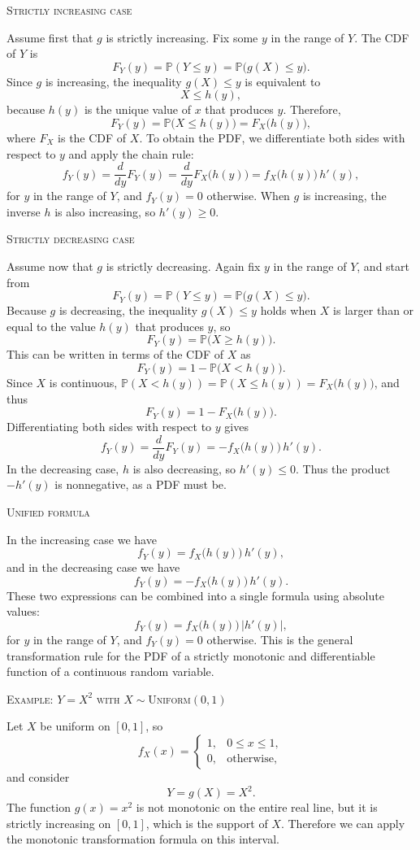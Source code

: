 \textsc{Strictly increasing case}

Assume first that \(g\) is strictly increasing.  
Fix some \(y\) in the range of \(Y\).  
The CDF of \(Y\) is
\[
F_Y(y)
=
\mathbb{P}(Y \le y)
=
\mathbb{P}\big(g(X) \le y\big).
\]
Since \(g\) is increasing, the inequality \(g(X) \le y\) is equivalent to
\[
X \le h(y),
\]
because \(h(y)\) is the unique value of \(x\) that produces \(y\).  
Therefore,
\[
F_Y(y)
=
\mathbb{P}\big(X \le h(y)\big)
=
F_X\big(h(y)\big),
\]
where \(F_X\) is the CDF of \(X\).  
To obtain the PDF, we differentiate both sides with respect to \(y\) and apply the chain rule:
\[
f_Y(y)
=
\frac{d}{dy}F_Y(y)
=
\frac{d}{dy}F_X\big(h(y)\big)
=
f_X\big(h(y)\big)\,h'(y),
\]
for \(y\) in the range of \(Y\), and \(f_Y(y)=0\) otherwise.  
When \(g\) is increasing, the inverse \(h\) is also increasing, so \(h'(y)\ge 0\).

\textsc{Strictly decreasing case}

Assume now that \(g\) is strictly decreasing.  
Again fix \(y\) in the range of \(Y\), and start from
\[
F_Y(y)
=
\mathbb{P}(Y \le y)
=
\mathbb{P}\big(g(X) \le y\big).
\]
Because \(g\) is decreasing, the inequality \(g(X) \le y\) holds when \(X\) is larger than or equal to the value \(h(y)\) that produces \(y\), so
\[
F_Y(y)
=
\mathbb{P}\big(X \ge h(y)\big).
\]
This can be written in terms of the CDF of \(X\) as
\[
F_Y(y)
=
1 - \mathbb{P}\big(X < h(y)\big).
\]
Since \(X\) is continuous, \(\mathbb{P}(X < h(y)) = \mathbb{P}(X \le h(y)) = F_X\big(h(y)\big)\), and thus
\[
F_Y(y)
=
1 - F_X\big(h(y)\big).
\]
Differentiating both sides with respect to \(y\) gives
\[
f_Y(y)
=
\frac{d}{dy}F_Y(y)
=
- f_X\big(h(y)\big)\,h'(y).
\]
In the decreasing case, \(h\) is also decreasing, so \(h'(y) \le 0\).  
Thus the product \(-h'(y)\) is nonnegative, as a PDF must be.  

\textsc{Unified formula}

In the increasing case we have
\[
f_Y(y)
=
f_X\big(h(y)\big)\,h'(y),
\]
and in the decreasing case we have
\[
f_Y(y)
=
- f_X\big(h(y)\big)\,h'(y).
\]
These two expressions can be combined into a single formula using absolute values:
\[
f_Y(y)
=
f_X\big(h(y)\big)\,\big|h'(y)\big|,
\]
for \(y\) in the range of \(Y\), and \(f_Y(y)=0\) otherwise.  
This is the general transformation rule for the PDF of a strictly monotonic and differentiable function of a continuous random variable.

\textsc{Example: \(Y = X^{2}\) with \(X \sim \text{Uniform}(0,1)\)}

Let \(X\) be uniform on \([0,1]\), so
\[
f_X(x)
=
\begin{cases}
1, & 0 \le x \le 1,\\
0, & \text{otherwise},
\end{cases}
\]
and consider
\[
Y = g(X) = X^{2}.
\]
The function \(g(x)=x^{2}\) is not monotonic on the entire real line, but it is strictly increasing on \([0,1]\), which is the support of \(X\).  
Therefore we can apply the monotonic transformation formula on this interval.

